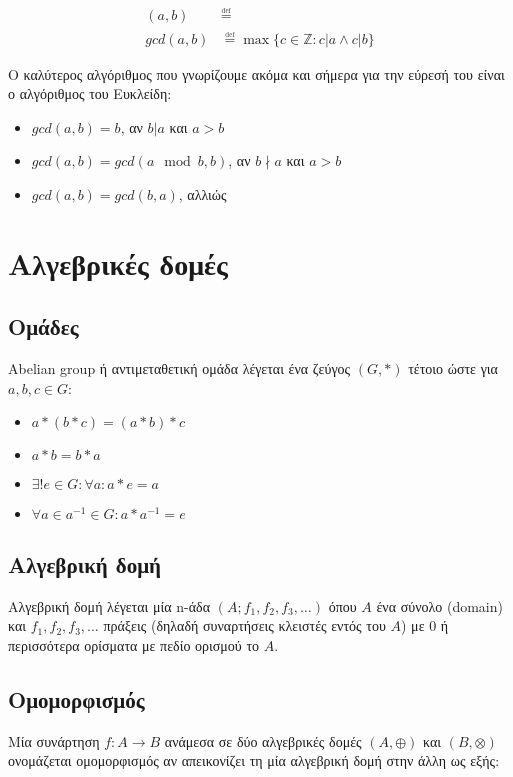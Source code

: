 \documentclass[11pt,a4paper]{book}
\newcommand{\defeq}{\overset{\underset{\mathrm{def}}{}}{=}}
\begin{document}
\begin{align*}
	( a, b ) &\defeq\\
	gcd( a, b ) &\defeq \max\{ c \in \mathbb{Z}: c|a \land c|b \}
\end{align*}

Ο καλύτερος αλγόριθμος που γνωρίζουμε ακόμα και σήμερα για την εύρεσή του είναι ο αλγόριθμος του Ευκλείδη:

\begin{itemize}
	\item $ gcd( a, b ) = b $, αν $ b|a $ και $ a > b $
	\item $ gcd( a, b ) = gcd( a \mod b, b ) $, αν $ b \nmid a $ και $ a > b $
	\item $ gcd( a, b ) = gcd( b, a ) $, αλλιώς
\end{itemize}

\section*{Αλγεβρικές δομές}

\subsection*{Ομάδες}

\textlatin{Abelian group} ή αντιμεταθετική ομάδα λέγεται ένα ζεύγος $(G, *)$ τέτοιο ώστε για $a, b, c \in G$:

\begin{itemize}
	\item $a * (b * c) = (a * b) * c$
	\item $a * b = b  * a$
	\item $\exists! e \in G: \forall a: a * e = a$
	\item $ \forall a \in a^{-1} \in G: a * a^{-1} = e$
\end{itemize}

\subsection*{Αλγεβρική δομή}
Αλγεβρική δομή λέγεται μία \textlatin{n-}άδα $( A; f_1, f_2, f_3, \ldots )$
όπου $A$ ένα σύνολο (\textlatin{domain}) και $f_1, f_2, f_3, \ldots$ πράξεις
(δηλαδή συναρτήσεις κλειστές εντός του $A$) με 0 ή περισσότερα ορίσματα με πεδίο ορισμού το $A$.

\subsection*{Ομομορφισμός}
Mία συνάρτηση $f: A \rightarrow B$ ανάμεσα σε δύο αλγεβρικές δομές $(A, \oplus)$ και $(B, \otimes)$ ονομάζεται ομομορφισμός αν απεικονίζει τη μία αλγεβρική δομή στην άλλη ως εξής:
\end{document}
